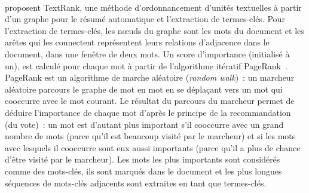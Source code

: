         ~\\ proposent TextRank, une méthode
        d'ordonnancement d'unités textuelles à partir d'un graphe pour le résumé
        automatique et l'extraction de termes-clés. Pour l'extraction de
        termes-clés, les n\oe{}uds du graphe sont les mots du document et les
        arêtes qui les connectent représentent leurs relations d'adjacence dans
        le document, dans une fenêtre de deux mots. Un score
        d'importance (initialisé à un), est calculé pour chaque mot à partir de
        l'algorithme itératif PageRank~\cite{brin1998pagerank}. PageRank est un
        algorithme de marche aléatoire (\textit{random walk})~: un marcheur
        aléatoire parcours le graphe de mot en mot en se déplaçant vers un mot
        qui cooccurre avec le mot courant. Le résultat du parcours du marcheur
        permet de déduire l'importance de chaque mot d'après le principe de la
        recommandation (du vote)~:  un mot est d'autant plus important s'il
        cooccurre avec un grand nombre de mots (parce qu'il est beaucoup visité
        par le marcheur) et si les mots avec lesquels il cooccurre sont eux
        aussi importants (parce qu'il a plus de chance d'être visité par le
        marcheur). Les mots les plus importants sont considérés comme des
        mots-clés, ils sont marqués dans le document et les plus longues
        séquences de mots-clés adjacents sont extraites en tant que termes-clés.
      
